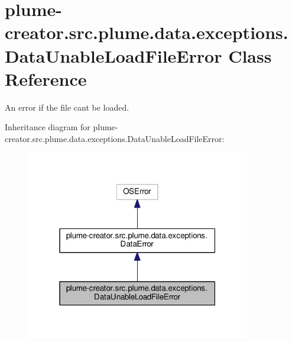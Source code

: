 \hypertarget{classplume-creator_1_1src_1_1plume_1_1data_1_1exceptions_1_1_data_unable_load_file_error}{}\section{plume-\/creator.src.\+plume.\+data.\+exceptions.\+Data\+Unable\+Load\+File\+Error Class Reference}
\label{classplume-creator_1_1src_1_1plume_1_1data_1_1exceptions_1_1_data_unable_load_file_error}


An error if the file can\textquotesingle{}t be loaded.  




Inheritance diagram for plume-\/creator.src.\+plume.\+data.\+exceptions.\+Data\+Unable\+Load\+File\+Error\+:
\nopagebreak
\begin{figure}[H]
\begin{center}
\leavevmode
\includegraphics[width=277pt]{classplume-creator_1_1src_1_1plume_1_1data_1_1exceptions_1_1_data_unable_load_file_error__inherit__graph}
\end{center}
\end{figure}


